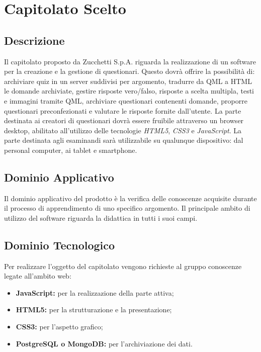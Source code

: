 \newpage
\section{Capitolato Scelto}
\subsection{Descrizione}
Il capitolato proposto da Zucchetti S.p.A. riguarda la realizzazione di un software per la creazione e la gestione di questionari. 
Questo dovrà offrire la possibilità di: archiviare quiz in un server suddivisi per argomento, tradurre da QML a HTML le domande archiviate, gestire risposte vero/falso, risposte a scelta multipla, testi e immagini tramite QML, archiviare questionari contenenti domande, proporre questionari preconfezionati e valutare le risposte fornite dall’utente.
La parte destinata ai creatori di questionari dovrà essere fruibile attraverso un browser desktop, abilitato all’utilizzo delle tecnologie \textit{HTML5}, \textit{CSS3} e \textit{JavaScript}.
La parte destinata agli esaminandi sarà utilizzabile su qualunque dispositivo: dal personal computer, ai tablet e smartphone.

\subsection{Dominio Applicativo}
Il dominio applicativo del prodotto è la verifica delle conoscenze acquisite durante il processo di apprendimento di uno specifico argomento.
Il principale ambito di utilizzo del software riguarda la didattica in tutti i suoi campi.

\subsection{Dominio Tecnologico}
Per realizzare l’oggetto del capitolato vengono richieste al gruppo conoscenze legate all’ambito web:
\begin{itemize}
\item \textbf{JavaScript:} per la realizzazione della parte attiva;
\item \textbf{HTML5:} per la strutturazione e la presentazione; 
\item \textbf{CSS3:} per l’aspetto grafico;
\item \textbf{PostgreSQL o MongoDB:} per l'archiviazione dei dati.
\end{itemize}

